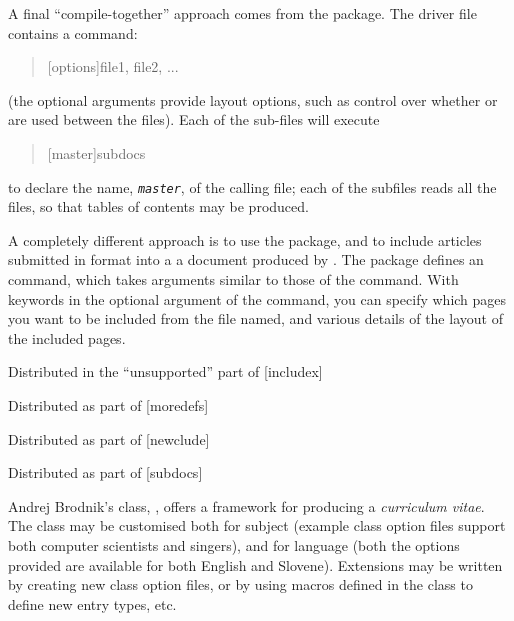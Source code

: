 A final ``compile-together'' approach comes from the 
package.  The driver file contains a  command:
\begin{quote}
[options]{file1, file2, ...}
\end{quote}
(the optional arguments provide layout options, such as control over
whether  or  are used between the
files).  Each of the sub-files will execute
\begin{quote}
  [master]{subdocs}
\end{quote}
to declare the name, \texttt{\emph{master}}, of the calling file;
each of the subfiles reads all the  files, so that
tables of contents may be produced.

A completely different approach is to use the 
package, and to include articles submitted in  format into a
a  document produced by \PDFLaTeX{}.  The package
defines an  command, which takes arguments similar to
those of the  command.  With keywords in the
optional argument of the command, you can specify which pages you want
to be included from the file named, and various details of the layout
of the included pages.
\begin{ctanrefs}
\item[combine.cls]
\item[combinet.sty]
\item[docmute.sty]
\item[includex.sty]Distributed in the ``unsupported'' part of
  [includex]
\item[moredefs.sty]Distributed as part of [moredefs]
\item[newclude.sty]Distributed as part of [newclude]
\item[pdfpages.sty]
\item[standalone.cls, standalone.sty]
\item[subdocs.sty]Distributed as part of [subdocs]
\item[subfiles.cls, etc.]
\end{ctanrefs}


Andrej Brodnik's class, , offers a framework for producing
a \emph{curriculum vitae}.  The class may be customised both for
subject (example class option files support both computer scientists
and singers), and for language (both the options provided are
available for both English and Slovene).  Extensions may be written by
creating new class option files, or by using macros defined in the
class to define new entry types, etc.

